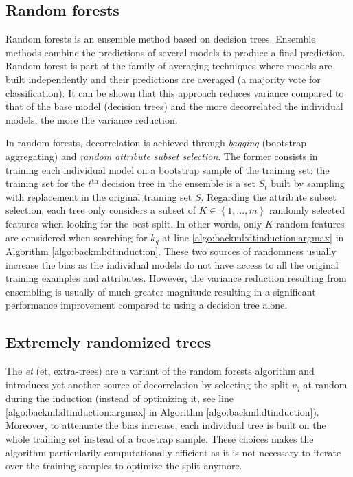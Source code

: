 \subsection{Random forests}
\label{ssec:backml:rf}

Random forests \parencite{breiman2001random} is an ensemble method based on decision trees. Ensemble methods combine the predictions of several models to produce a final prediction. Random forest is part of the family of averaging techniques where models are built independently and their predictions are averaged (\eg a majority vote for classification). It can be shown that this approach reduces variance compared to that of the base model (\eg decision trees) and the more decorrelated the individual models, the more the variance reduction.

In random forests, decorrelation is achieved through \textit{bagging} (\aka bootstrap aggregating) and \textit{random attribute subset selection}. The former consists in training each individual model on a bootstrap sample of the training set: the training set for the $t^{\text{th}}$ decision tree in the ensemble is a set $S_t$ built by sampling with replacement in the original training set $S$. Regarding the attribute subset selection, each tree only considers a subset of $K \in \left\{1,..., m\right\}$ randomly selected features when looking for the best split. In other words, only $K$ random features are considered when searching for $k_q$ at line \ref{algo:backml:dtinduction:argmax} in Algorithm \ref{algo:backml:dtinduction}. These two sources of randomness usually increase the bias as the individual models do not have access to all the original training examples and attributes. However, the variance reduction resulting from ensembling is usually of much greater magnitude resulting in a significant performance improvement compared to using a decision tree alone.

\subsection{Extremely randomized trees}
\label{ssec:backml:et}

The \textit{\acrlong{et}} (\acrshort{et}, \aka extra-trees) \parencite{geurts2006extremely} are a variant of the random forests algorithm and introduces yet another source of decorrelation by selecting the split $v_q$ at random during the induction (instead of optimizing it, see line \ref{algo:backml:dtinduction:argmax} in Algorithm \ref{algo:backml:dtinduction}). Moreover, to attenuate the bias increase, each individual tree is built on the whole training set instead of a boostrap sample. These choices makes the algorithm particularily computationally efficient as it is not necessary to iterate over the training samples to optimize the split anymore.

